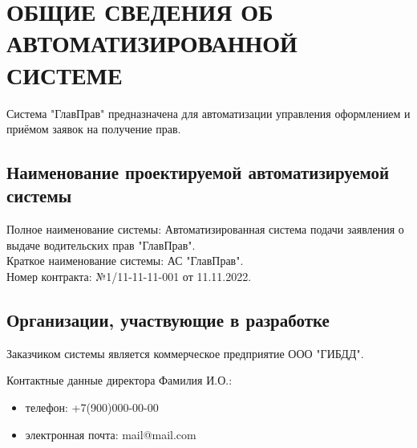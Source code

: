 \documentclass[russian, utf8, 12pt,pointsubsection,floatsubsection]{eskdtext}
\begin{document}
	\maketitle 

	\scriptsize
	\setcounter{tocdepth}{4}
	\tableofcontents
	\normalsize
	\newpage
	
 
\section{ОБЩИЕ СВЕДЕНИЯ ОБ АВТОМАТИЗИРОВАННОЙ СИСТЕМЕ} 
Система "ГлавПрав" предназначена для автоматизации управления оформлением и приёмом заявок на получение прав.
\subsection{Наименование проектируемой автоматизируемой системы}
Полное наименование системы: Автоматизированная система подачи заявления о выдаче водительских прав "ГлавПрав".\\

Краткое наименование системы: АС "ГлавПрав".\\

Номер контракта: №1/11-11-11-001 от 11.11.2022.\\
\subsection{Организации, участвующие в разработке}

Заказчиком системы является коммерческое предприятие ООО "ГИБДД".

Контактные данные директора Фамилия И.О.: 
\begin{itemize}
    \item телефон: +7(900)000-00-00 
    \item электронная почта: mail@mail.com
\end{itemize}\\
\end{document}
